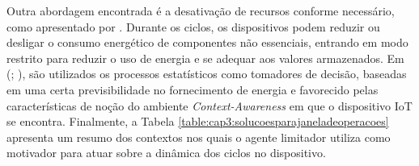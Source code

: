 Outra abordagem encontrada é a desativação de recursos conforme necessário, como apresentado por . Durante os ciclos, os dispositivos podem reduzir ou desligar o consumo energético de componentes não essenciais, entrando em modo restrito para reduzir o uso de energia e se adequar aos valores armazenados. Em (; ), são utilizados os processos estatísticos como tomadores de decisão, baseadas em uma certa previsibilidade no fornecimento de energia e favorecido pelas características de noção do ambiente \textit{Context-Awareness} em que o dispositivo \acs{IoT} se encontra. Finalmente, a Tabela \ref{table:cap3:solucoesparajaneladeoperacoes} apresenta um resumo dos contextos nos quais o agente limitador utiliza como motivador para atuar sobre a dinâmica dos ciclos no dispositivo.


